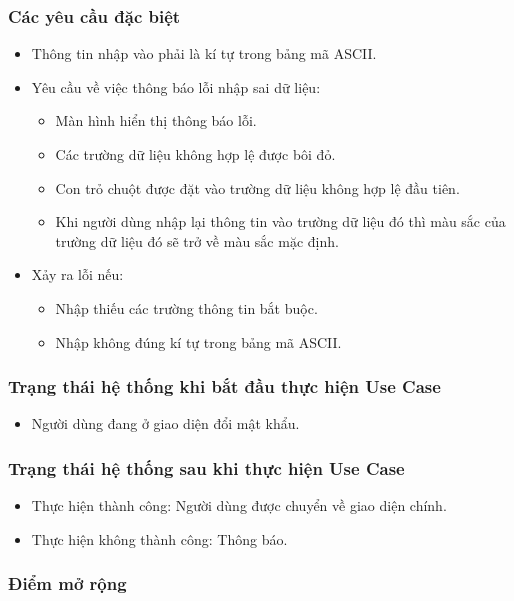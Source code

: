 \subsubsection{Các yêu cầu đặc biệt}
\begin{itemize}
    \item Thông tin nhập vào phải là kí tự trong bảng mã ASCII.
    \item Yêu cầu về việc thông báo lỗi nhập sai dữ liệu:
    \begin{itemize}
        \item Màn hình hiển thị thông báo lỗi.
        \item Các trường dữ liệu không hợp lệ được bôi đỏ.
        \item Con trỏ chuột được đặt vào trường dữ liệu không hợp lệ đầu tiên.
        \item Khi người dùng nhập lại thông tin vào trường dữ liệu đó thì màu sắc của trường dữ liệu đó sẽ trở về màu sắc mặc định.
    \end{itemize}
    \item Xảy ra lỗi nếu:
    \begin{itemize}
        \item Nhập thiếu các trường thông tin bắt buộc.
        \item Nhập không đúng kí tự trong bảng mã ASCII.
    \end{itemize}
\end{itemize}

\subsubsection{Trạng thái hệ thống khi bắt đầu thực hiện Use Case}
\begin{itemize}
    \item Người dùng đang ở giao diện đổi mật khẩu.
\end{itemize}

\subsubsection{Trạng thái hệ thống sau khi thực hiện Use Case}
\begin{itemize}
    \item Thực hiện thành công: Người dùng được chuyển về giao diện chính.
    \item Thực hiện không thành công: Thông báo.
\end{itemize}

\subsubsection{Điểm mở rộng}